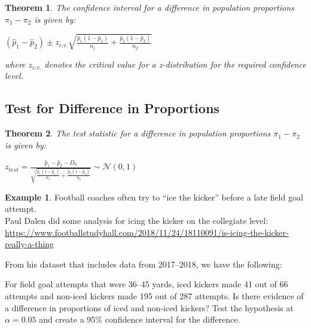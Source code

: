 \documentclass[
  11pt,
]{book}
\newtheorem{theorem}{Theorem}[chapter]
\theoremstyle{definition}
\theoremstyle{definition}
\newtheorem{example}{Example}[chapter]
\theoremstyle{definition}
\theoremstyle{definition}
\theoremstyle{remark}
\begin{document}
\begin{theorem}
The confidence interval for a difference in population proportions \(\pi_1 - \pi_2\) is given by:

\((\hat{p}_1 - \hat{p}_2) \pm z_{c.v.}\sqrt{\frac{\hat{p}_1(1-\hat{p}_1)}{n_1}+\frac{\hat{p}_2(1-\hat{p}_2)}{n_2}}\)

where \(z_{c.v.}\) denotes the critical value for a z-distribution for the required confidence level.
\end{theorem}

\hypertarget{test-for-difference-in-proportions}{%
\subsection{Test for Difference in Proportions}\label{test-for-difference-in-proportions}}

\begin{theorem}
The test statistic for a difference in population proportions \(\pi_1 - \pi_2\) is given by:

\(z_{test} = \frac{\hat{p}_1 - \hat{p}_2 - D_0}{\sqrt{\frac{\hat{p}_1(1-\hat{p}_1)}{n_1}+\frac{\hat{p}_2(1-\hat{p}_2)}{n_2}}} \sim \mathcal{N}(0,1)\)
\end{theorem}

\begin{example}
Football coaches often try to ``ice the kicker'' before a late field goal attempt.\\

Paul Dalen did some analysis for icing the kicker on the collegiate level:\\

\url{https://www.footballstudyhall.com/2018/11/24/18110091/is-icing-the-kicker-really-a-thing}

From his dataset that includes data from 2017--2018, we have the following:

For field goal attempts that were 36--45 yards, iced kickers made 41 out of 66 attempts and non-iced kickers made 195 out of 287 attempts. Is there evidence of a difference in proportions of iced and non-iced kickers? Test the hypothesis at \(\alpha=0.05\) and create a 95\% confidence interval for the difference.
\end{example}

\newpage
\end{document}
